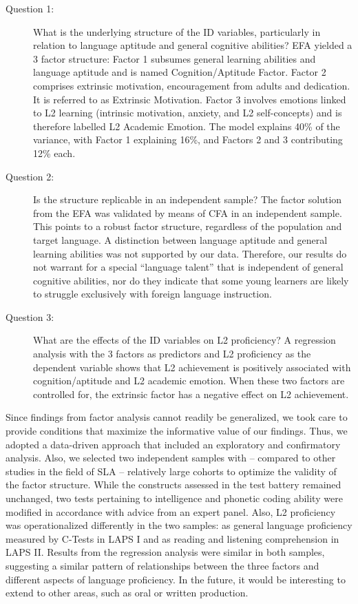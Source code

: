 \documentclass[output=paper]{langsci/langscibook}
\begin{document}
\begin{description}
\item[Question 1:] What is the underlying structure of the ID variables, particularly in relation to language aptitude and general cognitive abilities? EFA yielded a 3 factor structure: Factor 1 subsumes general learning abilities and language aptitude and is named Cognition/Aptitude Factor. Factor 2 comprises extrinsic motivation, encouragement from adults and dedication. It is referred to as Extrinsic Motivation. Factor 3 involves emotions linked to L2 learning (intrinsic motivation, anxiety, and L2 self-concepts) and is therefore labelled L2 Academic Emotion. The model explains 40\% of the variance, with Factor 1 explaining 16\%, and Factors 2 and 3 contributing 12\% each.

\item[Question 2:] Is the structure replicable in an independent sample? The factor solution from the EFA was validated by means of CFA in an independent sample. This points to a robust factor structure, regardless of the population and target language. A distinction between language aptitude and general learning abilities was not supported by our data. Therefore, our results do not warrant for a special “language talent” that is independent of general cognitive abilities, nor do they indicate that some young learners are likely to struggle exclusively with foreign language instruction.

\item[Question 3:] What are the effects of the ID variables on L2 proficiency? A regression analysis with the 3 factors as predictors and L2 proficiency as the dependent variable shows that L2 achievement is positively associated with cognition/aptitude and L2 academic emotion. When these two factors are controlled for, the extrinsic factor has a negative effect on L2 achievement. 
\end{description}

Since findings from factor analysis cannot readily be generalized, we took care to provide conditions that maximize the informative value of our findings. Thus, we adopted a data-driven approach that included an exploratory and confirmatory analysis. Also, we selected two independent samples with – compared to other studies in the field of SLA – relatively large cohorts to optimize the validity of the factor structure. While the constructs assessed in the test battery remained unchanged, two tests pertaining to intelligence and phonetic coding ability were modified in accordance with advice from an expert panel. Also, L2 proficiency was operationalized differently in the two samples: as general language proficiency measured by C-Tests in LAPS I and as reading and listening comprehension in LAPS II. Results from the regression analysis were similar in both samples, suggesting a similar pattern of relationships between the three factors and different aspects of language proficiency. In the future, it would be interesting to extend to other areas, such as oral or written production. 
\end{document}
